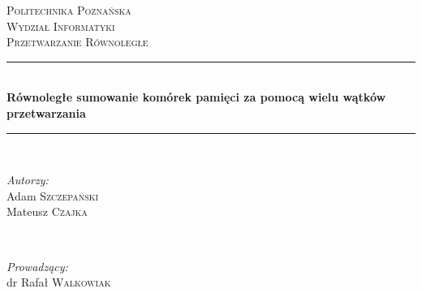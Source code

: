 \begin{titlepage}

\newcommand{\HRule}{\rule{\linewidth}{0.5mm}} %

\center %


\textsc{\LARGE Politechnika Poznańska}\\[1.5cm] %
\textsc{\Large Wydział Informatyki}\\[0.5cm] %
\textsc{\large Przetwarzanie Równoległe}\\[0.5cm] %


\HRule \\[0.4cm]
{ \huge \bfseries Równoległe sumowanie komórek pamięci za pomocą wielu wątków przetwarzania}\\[0.4cm] %
\HRule \\[1.5cm]


\begin{minipage}[t]{0.4\textwidth}
\begin{flushleft} \large
\emph{Autorzy:}\\
Adam \textsc{Szczepański} \\
Mateusz \textsc{Czajka} %
\end{flushleft}
\end{minipage}
~
\begin{minipage}[t]{0.4\textwidth}
\begin{flushright} \large
\emph{Prowadzący:} \\
dr Rafał \textsc{Walkowiak} %
\end{flushright}
\end{minipage}\\[2cm]


\end{titlepage}
